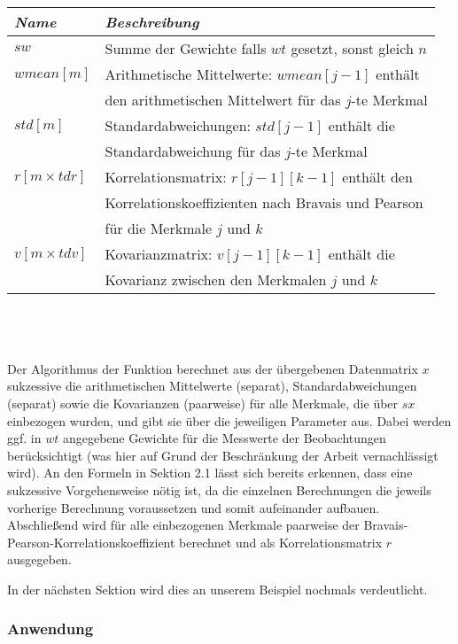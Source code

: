 \noindent \begin{tabular}[ht]{|l|l|}
  	\hline
  	\textit{Name} & \textit{Beschreibung}\\
  	\hline \hline
	$sw$ & Summe der Gewichte falls $wt$ gesetzt, sonst gleich $n$\\ \hline
  	$wmean[m]$ & Arithmetische Mittelwerte: $wmean[j - 1]$ enthält\\
  	& den arithmetischen Mittelwert für das $j$-te Merkmal\\ \hline
  	$std[m]$ & Standardabweichungen: $std[j - 1]$ enthält die\\
  	& Standardabweichung für das $j$-te Merkmal\\ \hline
  	$r[m \times tdr]$ & Korrelationsmatrix: $r[j - 1][k - 1]$ enthält den\\
	& Korrelationskoeffizienten nach Bravais und Pearson\\
	& für die Merkmale $j$ und $k$\\ \hline
	$v[m \times tdv]$ & Kovarianzmatrix: $v[j - 1][k - 1]$ enthält die\\
	& Kovarianz zwischen den Merkmalen $j$ und $k$\\
  	\hline
\end{tabular}\\\\

\\

\noindent Der Algorithmus der Funktion berechnet aus der übergebenen Datenmatrix $x$ sukzessive die arithmetischen Mittelwerte (separat), Standardabweichungen (separat) sowie die Kovarianzen (paarweise) für alle Merkmale, die über $sx$ einbezogen wurden, und gibt sie über die jeweiligen Parameter aus. Dabei werden ggf. in $wt$ angegebene Gewichte für die Messwerte der Beobachtungen berücksichtigt (was hier auf Grund der Beschränkung der Arbeit vernachlässigt wird). An den Formeln in Sektion 2.1 lässt sich bereits erkennen, dass eine sukzessive Vorgehensweise nötig ist, da die einzelnen Berechnungen die jeweils vorherige Berechnung voraussetzen und somit aufeinander aufbauen. Abschließend wird für alle einbezogenen Merkmale paarweise der Bravais-Pearson-Korrelationskoeffizient berechnet und als Korrelationsmatrix $r$ ausgegeben.

In der nächsten Sektion wird dies an unserem Beispiel nochmals verdeutlicht.

\subsubsection{Anwendung}

